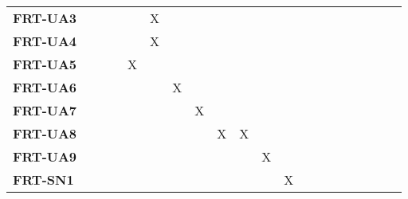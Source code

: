 \documentclass[12pt, titlepage]{article}
\begin{document}
\begin{landscape}
\begin{longtable}{|l|cccccccccccccccc|}
		\textbf{FRT-UA3} & ~                                                         & ~             & ~             & X             & ~             & ~             & ~             & ~             & ~             & ~             & ~             & ~             & ~             & ~             \\
		\textbf{FRT-UA4} & ~                                                         & ~             & ~             & X             & ~             & ~             & ~             & ~             & ~             & ~             & ~             & ~             & ~             & ~             \\
		\textbf{FRT-UA5} & ~                                                         & ~             & X             & ~             & ~             & ~             & ~             & ~             & ~             & ~             & ~             & ~             & ~             & ~             \\
		\textbf{FRT-UA6} & ~                                                         & ~             & ~             & ~             & X             & ~             & ~             & ~             & ~             & ~             & ~             & ~             & ~             & ~             \\
		\textbf{FRT-UA7} & ~                                                         & ~             & ~             & ~             & ~             & X             & ~             & ~             & ~             & ~             & ~             & ~             & ~             & ~             \\
		\textbf{FRT-UA8} & ~                                                         & ~             & ~             & ~             & ~             & ~             & X             & X             & ~             & ~             & ~             & ~             & ~             & ~             \\
		\textbf{FRT-UA9} & ~                                                         & ~             & ~             & ~             & ~             & ~             & ~             & ~             & X             & ~             & ~             & ~             & ~             & ~             \\
		\textbf{FRT-SN1} & ~                                                         & ~             & ~             & ~             & ~             & ~             & ~             & ~             & ~             &X             & ~             & ~             & ~             & ~             \\

\end{longtable}
\end{landscape}
\end{document}
